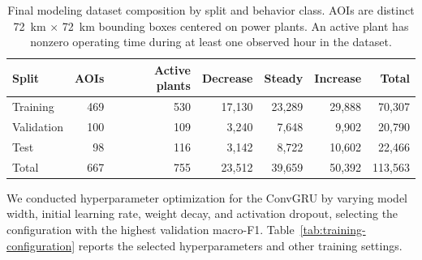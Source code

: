 \documentclass[sigconf,nonacm]{acmart}
\begin{document}
\begin{table}[t]
  \caption{Final modeling dataset composition by split and behavior class. AOIs
  are distinct 72~km $\times$ 72~km bounding boxes centered on power plants. An
  active plant has nonzero operating time during at least one observed hour in
  the dataset.}
  \label{tab:dataset-composition}
  \centering
  \small
  \setlength{\tabcolsep}{3.5pt}
  \begin{tabular}{@{}lrrrrrr@{}}
    \toprule
    Split & AOIs & Active plants & Decrease & Steady & Increase & Total \\
    \midrule
    Training   & 469 & 530 & 17,130 & 23,289 & 29,888 & 70,307 \\
    Validation & 100 & 109 &  3,240 &  7,648 &  9,902 & 20,790 \\
    Test       &  98 & 116 &  3,142 &  8,722 & 10,602 & 22,466 \\
    \midrule
    Total      & 667 & 755 & 23,512 & 39,659 & 50,392 & 113,563 \\
    \bottomrule
  \end{tabular}
\end{table}

We conducted hyperparameter optimization for the ConvGRU by varying model width, initial learning rate, weight
decay, and activation dropout, selecting the configuration with the highest
validation macro-F1. Table~\ref{tab:training-configuration} reports the
selected hyperparameters and other training settings.
\end{document}
